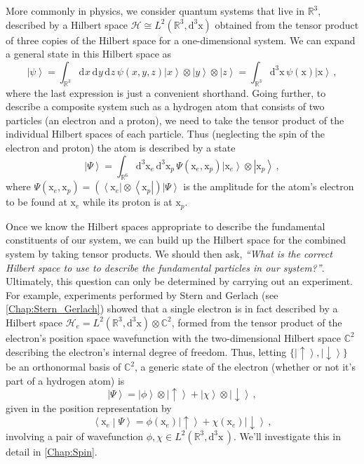 \documentclass{article}
\theoremstyle{plain}\theoremheaderfont{\normalfont\itshape}\theorembodyfont{\rmfamily}\theoremseparator{.}\newtheorem*{rem}{Remark}\newtheorem*{ex}{Example}\newtheorem*{proof}{Proof}\newtheorem*{altp}{Alternative proof}
\theoremstyle{plain}\theoremheaderfont{\normalfont\bfseries}\theorembodyfont{\rmfamily}\theoremseparator{.}\newtheorem{thm}{Theorem}[section]\newtheorem{lem}[thm]{Lemma}\newtheorem{prop}[thm]{Proposition}\newtheorem*{cor}{Corollary}\newtheorem{defn}[thm]{Definition}\newtheorem{clm}[thm]{Claim}\newtheorem{clminproof}{Claim}
\theoremstyle{break}\theoremheaderfont{\normalfont\itshape}\theorembodyfont{\rmfamily}\theoremseparator{.\medskip}\newtheorem*{proofskip}{Proof}\newtheorem*{exs}{Examples}\newtheorem*{rems}{Remarks}
\theoremstyle{break}\theoremheaderfont{\normalfont\bfseries}\theorembodyfont{\rmfamily}\theoremseparator{.\medskip}\newtheorem{lemskip}[thm]{Lemma}\newtheorem{defnskip}[thm]{Definition}\newtheorem{propskip}[thm]{Proposition}\newtheorem{thmskip}[thm]{Theorem}
\numberwithin{equation}{section}
\newcommand{\dd}[2][]{\mathrm{d}^{#1} #2\,}
\renewcommand{\d}[2][]{\mathrm{d}^{#1} #2}
\newcommand{\bra}[1]{\left\langle #1 \right|}
\newcommand{\ket}[1]{\left| #1 \right\rangle}
\newcommand{\braket}[2]{\left\langle #1 \middle| #2 \right\rangle}
\newcommand{\vb}[1]{\bm{\mathrm{#1}}}
\newcommand{\hb}{\mathcal{H}}
\newcommand{\RR}{\mathbb{R}}
\newcommand{\CC}{\mathbb{C}}
\begin{document}
    More commonly in physics, we consider quantum systems that live in \(\RR^3\), described by a Hilbert space \(\hb\cong L^2(\RR^3,\d[3]{\vb{x}})\) obtained from the tensor product of three copies of the Hilbert space for a one-dimensional system. We can expand a general state in this Hilbert space as
    \begin{equation}
        \ket{\psi}=\int_{\RR^3}\dd{x}\dd{y}\dd{z}\psi(x,y,z)\ket{x}\otimes\ket{y}\otimes\ket{z}=\int_{\RR^3}\dd[3]{\vb{x}}\psi(\vb{x})\ket{\vb{x}}\,,
    \end{equation}
    where the last expression is just a convenient shorthand. Going further, to describe a composite system such as a hydrogen atom that consists of two particles (an electron and a proton), we need to take the tensor product of the individual Hilbert spaces of each particle. Thus (neglecting the spin of the electron and proton) the atom is described by a state
    \begin{equation}
        \ket{\Psi}=\int_{\RR^6}\dd[3]{\vb{x}_e}\dd[3]{\vb{x}_p}\Psi(\vb{x}_e,\vb{x}_p)\ket{\vb{x}_e}\otimes\ket{\vb{x}_p}\,,
    \end{equation}
    where \(\Psi(\vb{x}_e,\vb{x}_p)=(\bra{\vb{x}_e}\otimes\bra{\vb{x}_p})\ket{\Psi}\) is the amplitude for the atom's electron to be found at \(\vb{x}_e\) while its proton is at \(\vb{x}_p\).

    Once we know the Hilbert spaces appropriate to describe the fundamental constituents of our system, we can build up the Hilbert space for the combined system by taking tensor products. We should then ask, \textit{``What is the correct Hilbert space to use to describe the fundamental particles in our system?''}. Ultimately, this question can only be determined by carrying out an experiment. For example, experiments performed by Stern and Gerlach (see \cref{Chap:Stern_Gerlach}) showed that a single electron is in fact described by a Hilbert space \(\hb_e = L^2(\RR^3,\d[3]{\vb{x}})\otimes\CC^2\), formed from the tensor product of the electron's position space wavefunction with the two-dimensional Hilbert space \(\CC^2\) describing the electron's internal degree of freedom. Thus, letting \(\{\ket{\uparrow},\ket{\downarrow}\}\) be an orthonormal basis of \(\CC^2\), a generic state of the electron (whether or not it's part of a hydrogen atom) is
    \begin{equation}
        \ket{\Psi}=\ket{\phi}\otimes\ket{\uparrow}+\ket{\chi}\otimes\ket{\downarrow}\,,
    \end{equation}
    given in the position representation by
    \begin{equation}
        \braket{\vb{x}_e}{\Psi}=\phi(\vb{x}_e)\ket{\uparrow}+\chi(\vb{x}_e)\ket{\downarrow}\,,
    \end{equation}
    involving a pair of wavefunction \(\phi,\chi\in L^2(\RR^3,\dd[3]{\vb{x}})\). We'll investigate this in detail in \cref{Chap:Spin}.
\end{document}
